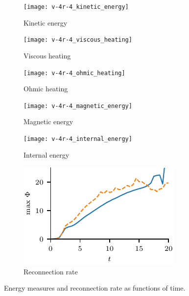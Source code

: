 \begin{figure}[t]
  \centering
  \begin{subfigure}{0.32\textwidth}
    \texttt{[image: v-4r-4\_kinetic\_energy]}
    \caption{Kinetic energy}
    \label{fig:v-4r-4_kinetic_energy}
  \end{subfigure}
  \hfill
  \begin{subfigure}{0.32\textwidth}
    \texttt{[image: v-4r-4\_viscous\_heating]}
    \caption{Viscous heating}%
    \label{fig:v-4r-4_viscous_heating}
  \end{subfigure}
  \hfill
  \begin{subfigure}{0.32\textwidth}
    \texttt{[image: v-4r-4\_ohmic\_heating]}
    \caption{Ohmic heating}%
    \label{fig:v-4r-4_ohmic_heating}
  \end{subfigure}
  \hfill
  \begin{subfigure}{0.32\textwidth}
    \texttt{[image: v-4r-4\_magnetic\_energy]}
    \caption{Magnetic energy}%
    \label{fig:v-4r-4_magnetic_energy}
  \end{subfigure}
  \hfill
  \begin{subfigure}{0.32\textwidth}
    \texttt{[image: v-4r-4\_internal\_energy]}
    \caption{Internal energy}%
    \label{fig:v-4r-4_internal_energy}
  \end{subfigure}
  \hfill
  \begin{subfigure}{0.32\textwidth}
    \includegraphics[width=\linewidth]{v-4r-4_reconn_rate_over_time}
    \caption{Reconnection rate}%
    \label{fig:v-4r-4_reconn_rate_over_time}
  \end{subfigure}
  \caption{Energy measures and reconnection rate as functions of time.}
\end{figure}

